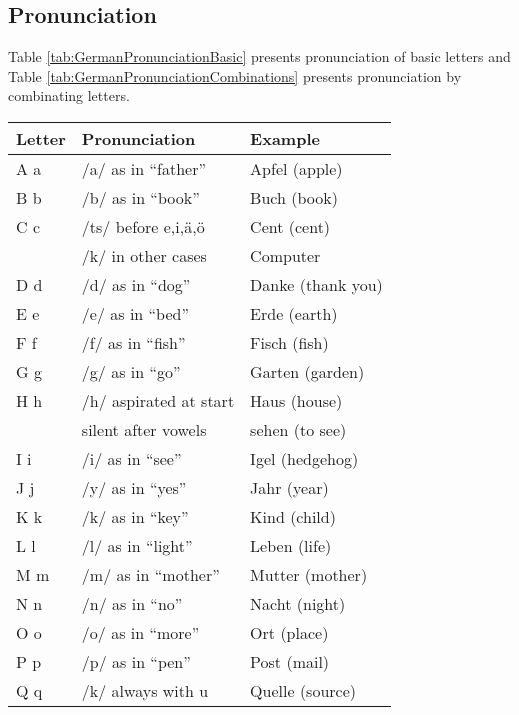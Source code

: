 \subsection{Pronunciation}\label{subsec:pronunciation}

Table \ref{tab:GermanPronunciationBasic} presents pronunciation of basic letters and Table \ref{tab:GermanPronunciationCombinations} presents pronunciation by combinating letters.

\begin{table}[h]
    \centering
    \begin{tabular}{|l|l|l|}
    \hline
    \textbf{Letter} & \textbf{Pronunciation} & \textbf{Example} \\
    \hline
    A a & /a/ as in ``father'' & Apfel (apple) \\
    \hline
    B b & /b/ as in ``book'' & Buch (book) \\
    \hline
    C c & /ts/ before e,i,\"{a},\"{o} & Cent (cent) \\
        & /k/ in other cases & Computer \\
    \hline
    D d & /d/ as in ``dog'' & Danke (thank you) \\
    \hline
    E e & /e/ as in ``bed'' & Erde (earth) \\
    \hline
    F f & /f/ as in ``fish'' & Fisch (fish) \\
    \hline
    G g & /g/ as in ``go'' & Garten (garden) \\
    \hline
    H h & /h/ aspirated at start & Haus (house) \\
        & silent after vowels & sehen (to see) \\
    \hline
    I i & /i/ as in ``see'' & Igel (hedgehog) \\
    \hline
    J j & /y/ as in ``yes'' & Jahr (year) \\
    \hline
    K k & /k/ as in ``key'' & Kind (child) \\
    \hline
    L l & /l/ as in ``light'' & Leben (life) \\
    \hline
    M m & /m/ as in ``mother'' & Mutter (mother) \\
    \hline
    N n & /n/ as in ``no'' & Nacht (night) \\
    \hline
    O o & /o/ as in ``more'' & Ort (place) \\
    \hline
    P p & /p/ as in ``pen'' & Post (mail) \\
    \hline
    Q q & /k/ always with u & Quelle (source) \\
    \hline

\end{tabular}
\end{table}
